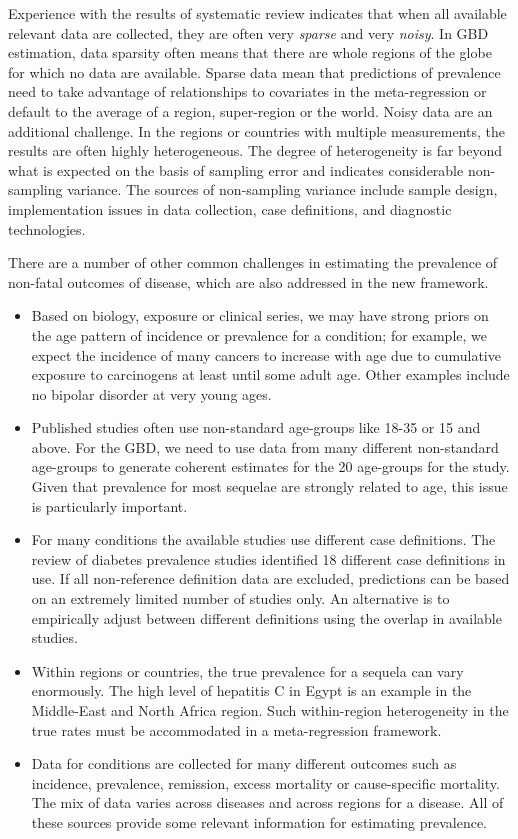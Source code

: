 Experience with the results of systematic review indicates that when
all available relevant data are collected, they are often very
\emph{sparse} and very \emph{noisy}.  In GBD estimation, data sparsity
often means that there are whole regions of the globe for which no
data are available.  Sparse data mean that predictions of prevalence
need to take advantage of relationships to covariates in the
meta-regression or default to the average of a region, super-region or
the world.  Noisy data are an additional challenge. In the regions or
countries with multiple measurements, the results are often highly
heterogeneous. The degree of heterogeneity is far beyond what is
expected on the basis of sampling error and indicates considerable
non-sampling variance.  The sources of non-sampling variance include
sample design, implementation issues in data collection, case
definitions, and diagnostic technologies.

There are a number of other common challenges in estimating the
prevalence of non-fatal outcomes of disease, which are also addressed
in the new framework.
\begin{itemize}

\item Based on biology, exposure or clinical series, we may have strong
priors on the age pattern of incidence or prevalence for a condition;
for example, we expect the incidence of many cancers to increase with
age due to cumulative exposure to carcinogens at least until some
adult age.  Other examples include no bipolar disorder at very young
ages.  

\item Published studies often use non-standard age-groups like 18-35
or 15 and above.  For the GBD, we need to use data from many different
non-standard age-groups to generate coherent estimates for the 20
age-groups for the study.  Given that prevalence for most sequelae are
strongly related to age, this issue is particularly important.

\item For many conditions the available studies use
different case definitions.  The review of diabetes prevalence studies
identified 18 different case definitions in use.  If all non-reference
definition data are excluded, predictions can be based on an extremely
limited number of studies only.  An alternative is to empirically
adjust between different definitions using the overlap
in available studies.

\item Within regions or
countries, the true prevalence for a sequela can vary enormously. The
high level of hepatitis C in Egypt is an example in the Middle-East
and North Africa region.  Such within-region heterogeneity in the true
rates must be accommodated in a meta-regression framework.

\item Data for conditions are collected for many different outcomes
such as incidence, prevalence, remission, excess mortality or
cause-specific mortality.  The mix of data varies across diseases and
across regions for a disease.  All of these sources provide some
relevant information for estimating prevalence.
\end{itemize}

